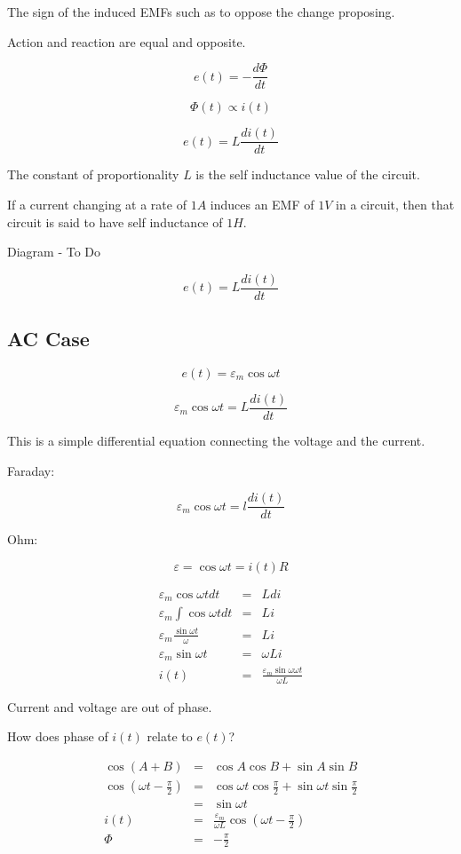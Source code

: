 \documentclass[a4paper,12pt]{article}
\begin{document}
The sign of the induced EMFs such as to oppose the change
proposing.

Action and reaction are equal and opposite.

\[ e(t) = - \frac{d \Phi}{dt} \]

\[ \Phi(t) \propto i(t) \]

\[ e(t) = L \frac{di(t)}{dt} \]

The constant of proportionality $L$ is the self inductance
value of the circuit.

If a current changing at a rate of $1A$ induces an EMF of $1V$
in a circuit, then that circuit is said to have self inductance of $1H$.

\begin{table}[hbtp]

Diagram - To Do

\end{table}

\[ e(t) = L \frac{di(t)}{dt} \]

\subsection{AC Case}

\[ e(t) = \varepsilon_{m} \cos{\omega t} \]

\[ \varepsilon_{m} \cos{\omega t} = L \frac{di(t)}{dt} \]

This is a simple differential equation connecting the voltage
and the current.

Faraday:

\[ \varepsilon_{m} \cos{\omega t} = l \frac{di(t)}{dt} \]

Ohm:

\[ \varepsilon = \cos{\omega t} = i(t) R \]

\begin{eqnarray*}
\varepsilon_{m} \cos{\omega t} dt & = & Ldi \\
\varepsilon_{m} \int \cos{\omega t} dt & = & Li \\
\varepsilon_{m} \frac{\sin{\omega t}}{\omega} & = & Li \\
\varepsilon_{m} \sin{\omega t} & = & \omega Li \\
i(t) & = & \frac{\varepsilon_{m} \sin{\omega \omega t}}{\omega L}
\end{eqnarray*}

Current and voltage are out of phase.

How does phase of $i(t)$ relate to $e(t)$?

\begin{eqnarray*}
\cos{(A + B)} & = & \cos{A}\cos{B} + \sin{A}\sin{B} \\
\cos{(\omega t - \frac{\pi}{2})} & = & \cos{\omega t}\cos{\frac{\pi}{2}}
+ \sin{\omega t}\sin{\frac{\pi}{2}} \\
	& = & \sin{\omega t} \\
i(t) & = & \frac{\varepsilon_{m}}{\omega L} \cos{\left(\omega t -
\frac{\pi}{2}\right)} \\
\Phi & = & - \frac{\pi}{2}
\end{eqnarray*}
\end{document}
